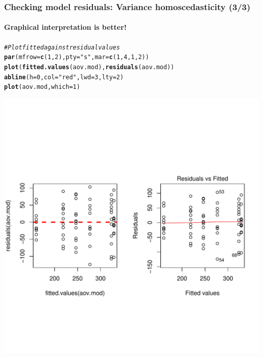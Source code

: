 \documentclass{beamer}\usepackage[]{graphicx}\usepackage[]{color}
\makeatletter
\newcommand{\hlnum}[1]{\textcolor[rgb]{0.686,0.059,0.569}{#1}}%
\newcommand{\hlstr}[1]{\textcolor[rgb]{0.192,0.494,0.8}{#1}}%
\newcommand{\hlcom}[1]{\textcolor[rgb]{0.678,0.584,0.686}{\textit{#1}}}%
\newcommand{\hlstd}[1]{\textcolor[rgb]{0.345,0.345,0.345}{#1}}%
\newcommand{\hlkwc}[1]{\textcolor[rgb]{0.333,0.667,0.333}{#1}}%
\newcommand{\hlkwd}[1]{\textcolor[rgb]{0.737,0.353,0.396}{\textbf{#1}}}%
\newenvironment{kframe}{%
 \def\at@end@of@kframe{}%
 \ifinner\ifhmode%
  \def\at@end@of@kframe{\end{minipage}}%
  \begin{minipage}{\columnwidth}%
 \fi\fi%
 \def\FrameCommand##1{\hskip\@totalleftmargin \hskip-\fboxsep
 \colorbox{shadecolor}{##1}\hskip-\fboxsep
     \hskip-\linewidth \hskip-\@totalleftmargin \hskip\columnwidth}%
 \MakeFramed {\advance\hsize-\width
   \@totalleftmargin\z@ \linewidth\hsize
   \@setminipage}}%
 {\par\unskip\endMakeFramed%
 \at@end@of@kframe}
\newenvironment{knitrout}{}{} %
\makeatother
\begin{document}
{{{
\begin{frame}[fragile]
\frametitle{Checking model residuals: Variance homoscedasticity (3/3)}
\framesubtitle{Graphical interpretation is better!}
\begin{knitrout}\scriptsize
{}\color{fgcolor}\begin{kframe}
\begin{alltt}
\hlcom{# Plot fitted against residual values}
\hlkwd{par}\hlstd{(}\hlkwc{mfrow}\hlstd{=}\hlkwd{c}\hlstd{(}\hlnum{1}\hlstd{,}\hlnum{2}\hlstd{),} \hlkwc{pty}\hlstd{=}\hlstr{"s"}\hlstd{,} \hlkwc{mar} \hlstd{=} \hlkwd{c}\hlstd{(}\hlnum{1}\hlstd{,} \hlnum{4}\hlstd{,} \hlnum{1}\hlstd{,} \hlnum{2}\hlstd{))}
\hlkwd{plot}\hlstd{(}\hlkwd{fitted.values}\hlstd{(aov.mod),} \hlkwd{residuals}\hlstd{(aov.mod))}
\hlkwd{abline}\hlstd{(}\hlkwc{h} \hlstd{=} \hlnum{0}\hlstd{,} \hlkwc{col} \hlstd{=} \hlstr{"red"}\hlstd{,} \hlkwc{lwd} \hlstd{=} \hlnum{3}\hlstd{,} \hlkwc{lty} \hlstd{=} \hlnum{2}\hlstd{)}
\hlkwd{plot}\hlstd{(aov.mod,} \hlkwc{which}\hlstd{=}\hlnum{1}\hlstd{)}
\end{alltt}
\end{kframe}

{\centering \includegraphics[width=0.7\linewidth]{figure/unnamed-chunk-47-1} 

}



\end{knitrout}
\end{frame}


}}}
\end{document}
